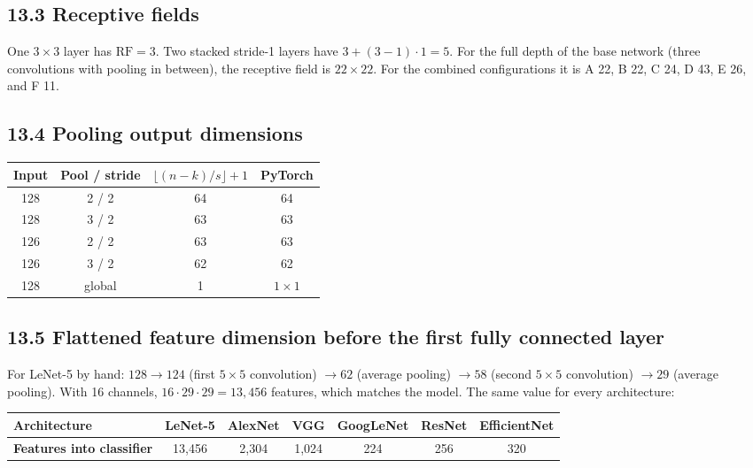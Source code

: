 \documentclass[12pt,a4paper]{article}
\begin{document}
\subsection*{13.3 Receptive fields}

One $3\times3$ layer has $\text{RF}=3$. Two stacked stride-1 layers have $3+(3-1)\cdot1=5$.
For the full depth of the base network (three convolutions with pooling in between),
the receptive field is $22\times22$. For the combined configurations it is
A 22, B 22, C 24, D 43, E 26, and F 11.

\subsection*{13.4 Pooling output dimensions}

\begin{center}
\renewcommand{\arraystretch}{1.2}\footnotesize
\begin{tabular}{|c|c|c|c|}
\hline
\textbf{Input} & \textbf{Pool / stride} & \textbf{$\lfloor (n-k)/s\rfloor+1$} & \textbf{PyTorch} \\ \hline
128 & 2 / 2 & 64 & 64 \\ \hline
128 & 3 / 2 & 63 & 63 \\ \hline
126 & 2 / 2 & 63 & 63 \\ \hline
126 & 3 / 2 & 62 & 62 \\ \hline
128 & global & 1 & $1\times1$ \\ \hline
\end{tabular}
\end{center}

\subsection*{13.5 Flattened feature dimension before the first fully connected layer}

For LeNet-5 by hand: $128\to124$ (first $5\times5$ convolution) $\to62$ (average pooling)
$\to58$ (second $5\times5$ convolution) $\to29$ (average pooling). With 16 channels,
$16\cdot29\cdot29=13{,}456$ features, which matches the model. The same value for every architecture:

\begin{center}
\renewcommand{\arraystretch}{1.2}\footnotesize
\begin{tabular}{|l|c|c|c|c|c|c|}
\hline
\textbf{Architecture} & LeNet-5 & AlexNet & VGG & GoogLeNet & ResNet & EfficientNet \\ \hline
\textbf{Features into classifier} & 13,456 & 2,304 & 1,024 & 224 & 256 & 320 \\ \hline
\end{tabular}
\end{center}
\end{document}
